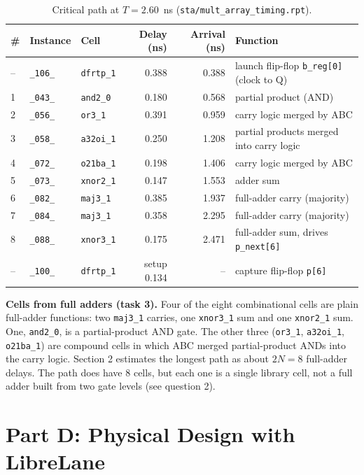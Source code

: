 \documentclass[11pt,a4paper]{article}
\newcommand{\cell}[1]{\texttt{#1}}
\begin{document}
\begin{table}[H]
\centering
\small
\begin{tabular}{lllrrl}
\toprule
\# & Instance & Cell & Delay (ns) & Arrival (ns) & Function \\
\midrule
-- & \texttt{\_106\_} & \cell{dfrtp\_1} & 0.388 & 0.388 & launch flip-flop \texttt{b\_reg[0]} (clock to Q) \\
1 & \texttt{\_043\_} & \cell{and2\_0}  & 0.180 & 0.568 & partial product (AND) \\
2 & \texttt{\_056\_} & \cell{or3\_1}   & 0.391 & 0.959 & carry logic merged by ABC \\
3 & \texttt{\_058\_} & \cell{a32oi\_1} & 0.250 & 1.208 & partial products merged into carry logic \\
4 & \texttt{\_072\_} & \cell{o21ba\_1} & 0.198 & 1.406 & carry logic merged by ABC \\
5 & \texttt{\_073\_} & \cell{xnor2\_1} & 0.147 & 1.553 & adder sum \\
6 & \texttt{\_082\_} & \cell{maj3\_1}  & 0.385 & 1.937 & full-adder carry (majority) \\
7 & \texttt{\_084\_} & \cell{maj3\_1}  & 0.358 & 2.295 & full-adder carry (majority) \\
8 & \texttt{\_088\_} & \cell{xnor3\_1} & 0.175 & 2.471 & full-adder sum, drives \texttt{p\_next[6]} \\
-- & \texttt{\_100\_} & \cell{dfrtp\_1} & setup 0.134 & -- & capture flip-flop \texttt{p[6]} \\
\bottomrule
\end{tabular}
\caption{Critical path at $T = 2.60$~ns (\texttt{sta/mult\_array\_timing.rpt}).}
\end{table}

\textbf{Cells from full adders (task 3).} Four of the eight combinational cells are
plain full-adder functions: two \cell{maj3\_1} carries, one \cell{xnor3\_1} sum and
one \cell{xnor2\_1} sum. One, \cell{and2\_0}, is a partial-product AND gate. The
other three (\cell{or3\_1}, \cell{a32oi\_1}, \cell{o21ba\_1}) are compound cells in
which ABC merged partial-product ANDs into the carry logic. Section 2 estimates the
longest path as about $2N = 8$ full-adder delays. The path does have 8 cells, but
each one is a single library cell, not a full adder built from two gate levels
(see question 2).

\section{Part D: Physical Design with LibreLane}
\end{document}
